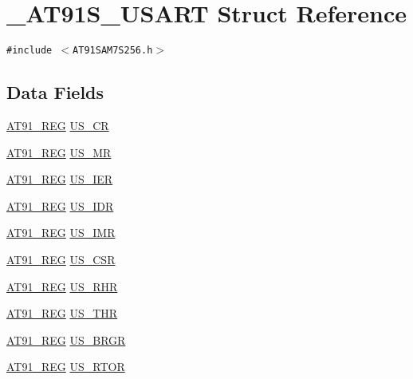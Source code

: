 \hypertarget{struct__AT91S__USART}{
\section{\_\-AT91S\_\-USART Struct Reference}
\label{struct__AT91S__USART}
}
{\tt \#include $<$AT91SAM7S256.h$>$}

\subsection*{Data Fields}
\begin{CompactItemize}
\item 
\hyperlink{AT91SAM7X256_8h_712ad5a1ac1bd02f3e95a7526c283ce1}{AT91\_\-REG} \hyperlink{struct__AT91S__USART_02c84ac26acfbb9621cde9e11e70b3e1}{US\_\-CR}
\item 
\hyperlink{AT91SAM7X256_8h_712ad5a1ac1bd02f3e95a7526c283ce1}{AT91\_\-REG} \hyperlink{struct__AT91S__USART_091b71f9f606a54b115910aed19d5416}{US\_\-MR}
\item 
\hyperlink{AT91SAM7X256_8h_712ad5a1ac1bd02f3e95a7526c283ce1}{AT91\_\-REG} \hyperlink{struct__AT91S__USART_32f11fc267293f03d51a7f7e9435f9f7}{US\_\-IER}
\item 
\hyperlink{AT91SAM7X256_8h_712ad5a1ac1bd02f3e95a7526c283ce1}{AT91\_\-REG} \hyperlink{struct__AT91S__USART_cdccf0e5fc2b85fa777ac58a968139b7}{US\_\-IDR}
\item 
\hyperlink{AT91SAM7X256_8h_712ad5a1ac1bd02f3e95a7526c283ce1}{AT91\_\-REG} \hyperlink{struct__AT91S__USART_d9c73a10ef0097e1f414c55091b77b10}{US\_\-IMR}
\item 
\hyperlink{AT91SAM7X256_8h_712ad5a1ac1bd02f3e95a7526c283ce1}{AT91\_\-REG} \hyperlink{struct__AT91S__USART_d6d83c447c95577160767aeea0f1a404}{US\_\-CSR}
\item 
\hyperlink{AT91SAM7X256_8h_712ad5a1ac1bd02f3e95a7526c283ce1}{AT91\_\-REG} \hyperlink{struct__AT91S__USART_08ea9921359c45c640b6911fda1dddfb}{US\_\-RHR}
\item 
\hyperlink{AT91SAM7X256_8h_712ad5a1ac1bd02f3e95a7526c283ce1}{AT91\_\-REG} \hyperlink{struct__AT91S__USART_8db8959953584eac2c327f2e35bacc73}{US\_\-THR}
\item 
\hyperlink{AT91SAM7X256_8h_712ad5a1ac1bd02f3e95a7526c283ce1}{AT91\_\-REG} \hyperlink{struct__AT91S__USART_dc6949ccb9b40260d28130e73a6dabcc}{US\_\-BRGR}
\item 
\hyperlink{AT91SAM7X256_8h_712ad5a1ac1bd02f3e95a7526c283ce1}{AT91\_\-REG} \hyperlink{struct__AT91S__USART_f0fcbe1b1fb83dedd5311cdcb45138cc}{US\_\-RTOR}

\end{CompactItemize}
